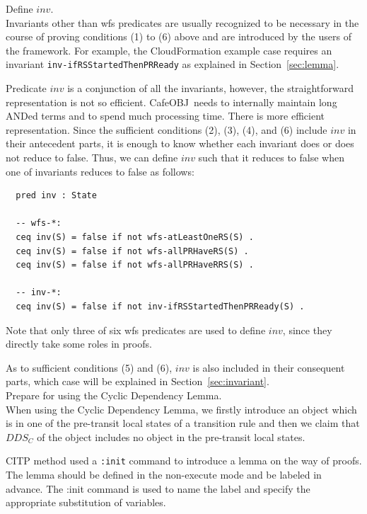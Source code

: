 \documentclass[12pt]{report}
\newcommand{\cafeobj}{{\sf CafeOBJ}~}
\begin{document}
 Define $inv$. \\ Invariants other than wfs
predicates are usually recognized to be necessary in the course of
proving conditions (1) to (6) above and are introduced by the users of
the framework. For example, the CloudFormation example case requires
an invariant {\tt inv-ifRSStartedThenPRReady} as explained in
Section~\ref{sec:lemma}.

Predicate $inv$ is a conjunction of all the invariants, however, the
straightforward representation is not so efficient. \cafeobj needs to
internally maintain long ANDed terms and to spend much processing
time. There is more efficient representation. Since the sufficient
conditions (2), (3), (4), and (6) include $inv$ in their antecedent
parts, it is enough to know whether each invariant does or does not
reduce to false. Thus, we can define $inv$ such that it reduces to
false when one of invariants reduces to false as follows:
\begin{verbatim}
  pred inv : State

  -- wfs-*:
  ceq inv(S) = false if not wfs-atLeastOneRS(S) .
  ceq inv(S) = false if not wfs-allPRHaveRS(S) .
  ceq inv(S) = false if not wfs-allPRHaveRRS(S) .

  -- inv-*:
  ceq inv(S) = false if not inv-ifRSStartedThenPRReady(S) .
\end{verbatim}
Note that only three of six wfs predicates are used to define $inv$,
since they directly take some roles in proofs.

As to sufficient conditions (5) and (6), $inv$ is also included in
their consequent parts, which case will be explained in
Section~\ref{sec:invariant}.\\

 Prepare for using the Cyclic Dependency
Lemma. \\ When using the Cyclic Dependency Lemma, we firstly introduce
an object which is in one of the pre-transit local states of a
transition rule and then we claim that $DDS_C$ of the object includes
no object in the pre-transit local states.

CITP method used a {\tt :init} command to introduce a lemma on the way
of proofs.  The lemma should be defined in the non-execute mode and be
labeled in advance. The :init command is used to name the label and
specify the appropriate substitution of variables.
\end{document}
